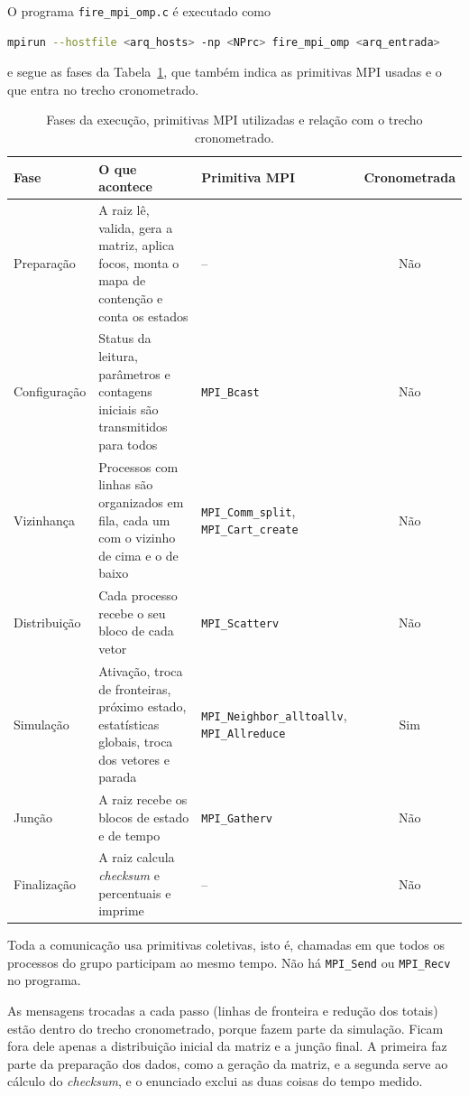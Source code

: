 \documentclass[11pt,a4paper]{article}
\begin{document}
O programa \texttt{fire\_mpi\_omp.c} é executado como
\begin{lstlisting}[language=bash,numbers=none]
mpirun --hostfile <arq_hosts> -np <NPrc> fire_mpi_omp <arq_entrada>
\end{lstlisting}
e segue as fases da Tabela~\ref{tab:fases}, que também indica as primitivas MPI usadas e o que entra no trecho cronometrado.

\begin{table}[H]
\centering
\small
\begin{tabular}{@{}lp{}lc@{}}
\toprule
Fase & O que acontece & Primitiva MPI & Cronometrada \\
\midrule
Preparação      & A raiz lê, valida, gera a matriz, aplica focos, monta o mapa de contenção e conta os estados & -- & Não \\
Configuração    & Status da leitura, parâmetros e contagens iniciais são transmitidos para todos & \texttt{MPI\_Bcast} & Não \\
Vizinhança      & Processos com linhas são organizados em fila, cada um com o vizinho de cima e o de baixo & \texttt{MPI\_Comm\_split}, \texttt{MPI\_Cart\_create} & Não \\
Distribuição    & Cada processo recebe o seu bloco de cada vetor & \texttt{MPI\_Scatterv} & Não \\
Simulação       & Ativação, troca de fronteiras, próximo estado, estatísticas globais, troca dos vetores e parada & \texttt{MPI\_Neighbor\_alltoallv}, \texttt{MPI\_Allreduce} & Sim \\
Junção          & A raiz recebe os blocos de estado e de tempo & \texttt{MPI\_Gatherv} & Não \\
Finalização     & A raiz calcula \emph{checksum} e percentuais e imprime & -- & Não \\
\bottomrule
\end{tabular}
\caption{Fases da execução, primitivas MPI utilizadas e relação com o trecho cronometrado.}
\label{tab:fases}
\end{table}

Toda a comunicação usa primitivas coletivas, isto é, chamadas em que todos os processos do grupo participam ao mesmo tempo. Não há \texttt{MPI\_Send} ou \texttt{MPI\_Recv} no programa.

As mensagens trocadas a cada passo (linhas de fronteira e redução dos totais) estão dentro do trecho cronometrado, porque fazem parte da simulação. Ficam fora dele apenas a distribuição inicial da matriz e a junção final. A primeira faz parte da preparação dos dados, como a geração da matriz, e a segunda serve ao cálculo do \emph{checksum}, e o enunciado exclui as duas coisas do tempo medido.
\end{document}
